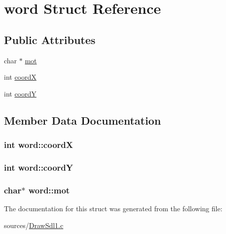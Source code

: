 \hypertarget{structword}{\section{word Struct Reference}
\label{structword}
}
\subsection*{Public Attributes}
\begin{DoxyCompactItemize}
\item 
char $\ast$ \hyperlink{structword_a4130f30b557c718dd1381e5e5f7e8ca0}{mot}
\item 
int \hyperlink{structword_a8da781998913bc93ed903dd6359a9676}{coord\-X}
\item 
int \hyperlink{structword_ad00a3e9a6db8053dee4386842851d4ce}{coord\-Y}
\end{DoxyCompactItemize}


\subsection{Member Data Documentation}
\hypertarget{structword_a8da781998913bc93ed903dd6359a9676}{
\subsubsection[{coord\-X}]{\setlength{\rightskip}{0pt plus 5cm}int word\-::coord\-X}}\label{structword_a8da781998913bc93ed903dd6359a9676}
\hypertarget{structword_ad00a3e9a6db8053dee4386842851d4ce}{
\subsubsection[{coord\-Y}]{\setlength{\rightskip}{0pt plus 5cm}int word\-::coord\-Y}}\label{structword_ad00a3e9a6db8053dee4386842851d4ce}
\hypertarget{structword_a4130f30b557c718dd1381e5e5f7e8ca0}{
\subsubsection[{mot}]{\setlength{\rightskip}{0pt plus 5cm}char$\ast$ word\-::mot}}\label{structword_a4130f30b557c718dd1381e5e5f7e8ca0}


The documentation for this struct was generated from the following file\-:\begin{DoxyCompactItemize}
\item 
sources/\hyperlink{_draw_sdl1_8c}{Draw\-Sdl1.\-c}\end{DoxyCompactItemize}
